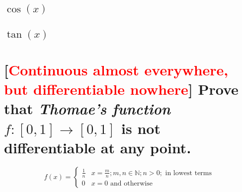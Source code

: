 \documentclass[letterpaper]{article}
\begin{document}
\subsection{$\cos(x)$}
\subsection{$\tan(x)$}

\pagebreak

\section{[\textcolor{red}{Continuous almost everywhere, but differentiable nowhere}] Prove that \textit{Thomae's function} $f:[0,1]\rightarrow[0,1]$ is not differentiable at any point.}
\begin{displaymath}
	f(x) = \left\{
		\begin{array}{ll}
			\frac{1}{n} & x=\frac{m}{n}; m,n\in\mathbb{N};n>0;\text{ in lowest terms} \\
			0 & x=0 \text{ and otherwise}
		\end{array}
	\right.
\end{displaymath}
\end{document}
